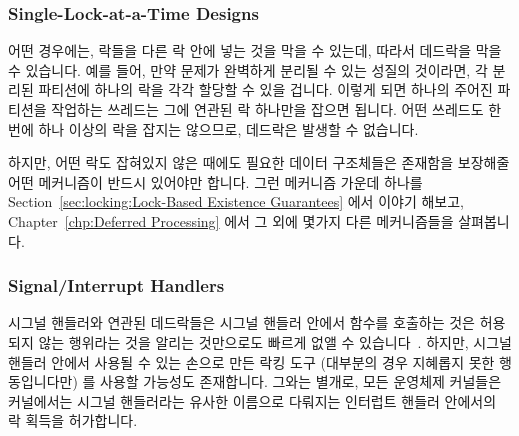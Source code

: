 \subsubsection{Single-Lock-at-a-Time Designs}
\label{sec:locking:Single-Lock-at-a-Time Designs}

어떤 경우에는, 락들을 다른 락 안에 넣는 것을 막을 수 있는데, 따라서 데드락을
막을 수 있습니다.
예를 들어, 만약 문제가 완벽하게 분리될 수 있는 성질의 것이라면, 각 분리된
파티션에 하나의 락을 각각 할당할 수 있을 겁니다.
이렇게 되면 하나의 주어진 파티션을 작업하는 쓰레드는 그에 연관된 락 하나만을
잡으면 됩니다.
어떤 쓰레드도 한번에 하나 이상의 락을 잡지는 않으므로, 데드락은 발생할 수
없습니다.

하지만, 어떤 락도 잡혀있지 않은 때에도 필요한 데이터 구조체들은 존재함을
보장해줄 어떤 메커니즘이 반드시 있어야만 합니다.
그런 메커니즘 가운데 하나를 Section~\ref{sec:locking:Lock-Based Existence
Guarantees} 에서 이야기 해보고, Chapter~\ref{chp:Deferred Processing} 에서 그
외에 몇가지 다른 메커니즘들을 살펴봅니다.

\subsubsection{Signal/Interrupt Handlers}
\label{sec:locking:Signal/Interrupt Handlers}

시그널 핸들러와 연관된 데드락들은 시그널 핸들러 안에서
 함수를 호출하는 것은 허용되지 않는 행위라는 것을
알리는 것만으로도 빠르게 없앨 수 있습니다~\cite{OpenGroup1997pthreads}.
하지만, 시그널 핸들러 안에서 사용될 수 있는 손으로 만든 락킹 도구 (대부분의
경우 지혜롭지 못한 행동입니다만) 를 사용할 가능성도 존재합니다.
그와는 별개로, 모든 운영체제 커널들은 커널에서는 시그널 핸들러라는 유사한
이름으로 다뤄지는 인터럽트 핸들러 안에서의 락 획득을 허가합니다.

